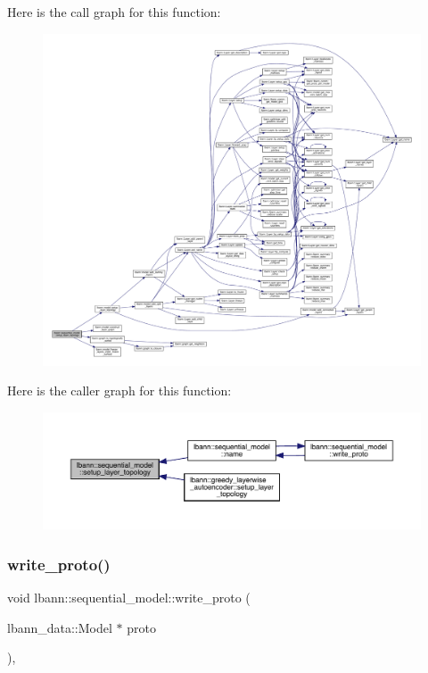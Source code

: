 Here is the call graph for this function\+:\nopagebreak
\begin{figure}[H]
\begin{center}
\leavevmode
\includegraphics[width=350pt]{classlbann_1_1sequential__model_a3801a58530388fb6a8cb3e1c018e827d_cgraph}
\end{center}
\end{figure}
Here is the caller graph for this function\+:\nopagebreak
\begin{figure}[H]
\begin{center}
\leavevmode
\includegraphics[width=350pt]{classlbann_1_1sequential__model_a3801a58530388fb6a8cb3e1c018e827d_icgraph}
\end{center}
\end{figure}
\mbox{\label{classlbann_1_1sequential__model_a53a83327a1115a53affa78c93344e641}} 
\subsubsection{\texorpdfstring{write\+\_\+proto()}{write\_proto()}}
{\footnotesize\ttfamily void lbann\+::sequential\+\_\+model\+::write\+\_\+proto (\begin{DoxyParamCaption}\item[{lbann\+\_\+data\+::\+Model $\ast$}]{proto }\end{DoxyParamCaption})\hspace{0.3cm}{\ttfamily [override]}, {\ttfamily [virtual]}}

